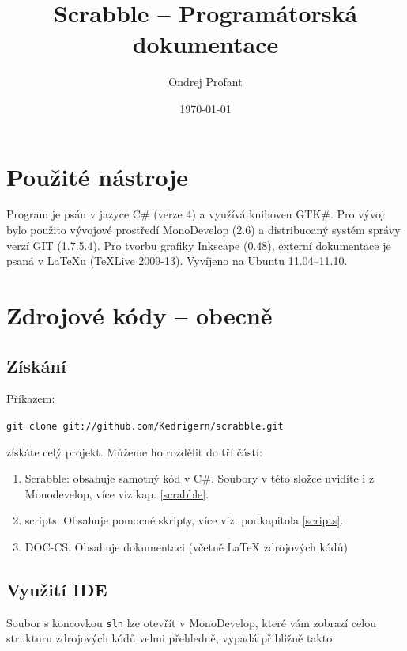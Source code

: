 \documentclass[a4paper]{article}
\title{Scrabble -- Programátorská dokumentace}
\author{Ondrej Profant}
\date{\today}
\begin{document}
\tableofcontents	

\section{Použité nástroje}
Program je psán v jazyce C\# (verze 4) a využívá knihoven GTK\#. 
Pro vývoj bylo použito vývojové prostředí MonoDevelop (2.6) a distribuoaný systém správy verzí GIT (1.7.5.4).
Pro tvorbu grafiky Inkscape (0.48), externí dokumentace je psaná v LaTeXu (TeXLive 2009-13). Vyvíjeno na Ubuntu 11.04--11.10.

\section{Zdrojové kódy -- obecně}
\subsection{Získání}
Příkazem:

\texttt{git clone git://github.com/Kedrigern/scrabble.git} 

\noindent
získáte celý projekt. Můžeme ho rozdělit do tří částí:
\begin{enumerate}
\item Scrabble: obsahuje samotný kód v C\#. Soubory v této složce uvidíte i z Monodevelop, více viz kap. \ref{scrabble}.
\item scripts: Obsahuje pomocné skripty, více viz. podkapitola \ref{scripts}.
\item DOC-CS: Obsahuje dokumentaci (včetně \LaTeX{} zdrojových kódů)
\end{enumerate}

\subsection{Využití IDE}
Soubor s koncovkou \texttt{sln} lze otevřít v MonoDevelop, které vám zobrazí celou strukturu zdrojových kódů velmi přehledně, vypadá přibližně takto:
\end{document}
